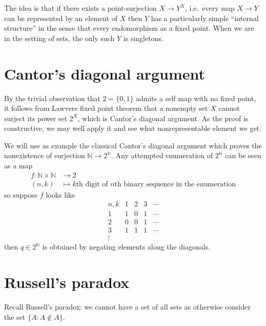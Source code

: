 \documentclass[a4paper]{article}
\newcommand*{\N}{{\mathbb{N}}}
\begin{document}
The idea is that if there exists a point-surjection \(X \to Y^X\), i.e.\ every map \(X \to Y\) can be represented by an element of \(X\) then \(Y\) has a particularly simple ``internal structure'' in the sense that every endomorphism as a fixed point. When we are in the setting of sets, the only such \(Y\) is singletons.

\section{Cantor's diagonal argument}

By the trivial observation that \(2 = \{0, 1\}\) admits a self map with no fixed point, it follows from Lawvere fixed point theorem that a nonempty set \(X\) cannot surject its power set \(2^X\), which is Cantor's diagonal argument. As the proof is constructive, we may well apply it and see what nonrepresentable element we get.

We will use as example the classical Cantor's diagonal argument which proves the nonexistence of surjection \(\N \to 2^\N\). Any attempted enumeration of \(2^\N\) can be seen as a map
\begin{align*}
  f: \N \times \N &\to 2 \\
  (n, k) &\mapsto \text{\(k\)th digit of \(n\)th binary sequence in the enumeration}
\end{align*}
so suppose \(f\) looks like
\[
  \begin{array}{c|ccccc}
    n, k & 1 & 2 & 3 & \cdots \\ \hline
    1 & 1 & 0 & 1 & \cdots \\
    2 & 0 & 0 & 1 & \cdots \\
    3 & 1 & 1 & 1 & \cdots \\
    \vdots
  \end{array}
\]
then \(q \in 2^\N\) is obtained by negating elements along the diagonals.

\section{Russell's paradox}

Recall Russell's paradox: we cannot have a set of all sets as otherwise consider the set \(\{A: A \notin A\}\).

\end{document}
